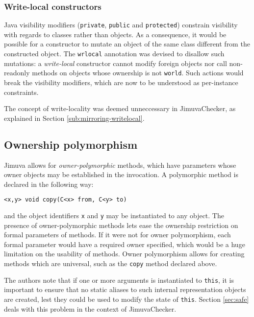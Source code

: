 \documentclass{pracamgr}
\theoremstyle{all}
\begin{document}
\subsubsection{Write-local constructors}
\label{sub:jimuva-wrlocal}

Java visibility modifiers (\texttt{private}, \texttt{public} and
\texttt{protected}) constrain visibility with regards to classes
rather than objects. As a consequence, it would be possible for a
constructor to mutate an object of the same class different from the
constructed object. The \texttt{wrlocal} annotation was devised to
disallow such mutations: a \emph{write-local} constructor cannot
modify foreign objects nor call non-readonly methods on objects whose
ownership is not \texttt{world}. Such actions would break the
visibility modifiers, which are now to be understood as per-instance
constraints.

The concept of write-locality was deemed unneccessary in
JimuvaChecker, as explained in Section \ref{sub:mirroring-writelocal}.

\subsection{Ownership polymorphism}

\label{sec:jimuva:poly}

Jimuva allows for \emph{owner-polymorphic} methods, which have
parameters whose owner objects may be established in the invocation. A
polymorphic method is declared in the following way:
\begin{center}
  \texttt{<x,y> void copy(C<x> from, C<y> to)}
\end{center}
and the object identifiers \texttt{x} and \texttt{y} may be
instantiated to any object. The presence of owner-polymorphic methods
lets ease the ownership restriction on formal parameters of
methods. If it were not for owner polymorphism, each formal parameter
would have a required owner specified, which would be a huge
limitation on the usability of methods. Owner polymorphism allows for
creating methods which are universal, such as the \texttt{copy} method
declared above.

The authors note that if one or more arguments is instantiated to
\texttt{this}, it is important to ensure that no static aliases to
such internal representation objects are created, lest they could be
used to modify the state of \texttt{this}. Section \ref{sec:safe}
deals with this problem in the context of JimuvaChecker.
\end{document}
